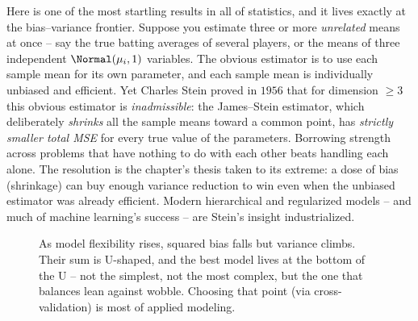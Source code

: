 \begin{paradoxbox}
Here is one of the most startling results in all of statistics, and it lives
exactly at the bias--variance frontier. Suppose you estimate three or more
\emph{unrelated} means at once -- say the true batting averages of several
players, or the means of three independent $\Normal(\mu_i,1)$ variables. The
obvious estimator is to use each sample mean for its own parameter, and each
sample mean is individually unbiased and efficient. Yet Charles Stein proved in
$1956$ that for dimension $\ge 3$ this obvious estimator is \emph{inadmissible}:
the James--Stein estimator, which deliberately \emph{shrinks} all the sample
means toward a common point, has \emph{strictly smaller total MSE} for every
true value of the parameters. Borrowing strength across problems that have
nothing to do with each other beats handling each alone. The resolution is the
chapter's thesis taken to its extreme: a dose of bias (shrinkage) can buy enough
variance reduction to win even when the unbiased estimator was already efficient.
Modern hierarchical and regularized models -- and much of machine learning's
success -- are Stein's insight industrialized.
\end{paradoxbox}

\begin{figure}[H]
\centering
{}
\caption{As model flexibility rises, squared bias falls but variance climbs.
Their sum is U-shaped, and the best model lives at the bottom of the U -- not the
simplest, not the most complex, but the one that balances lean against wobble.
Choosing that point (via cross-validation) is most of applied modeling.}
\label{ch30:fig-bv-curve}
\end{figure}

